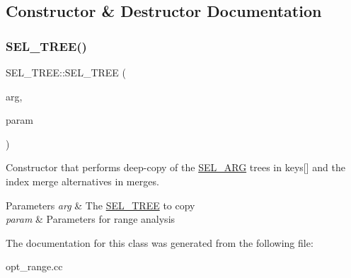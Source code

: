 \subsection{Constructor \& Destructor Documentation}
\mbox{\label{classSEL__TREE_aebc925ee4102808de1b168ec4989411c}} 
\subsubsection{\texorpdfstring{S\+E\+L\+\_\+\+T\+R\+E\+E()}{SEL\_TREE()}}
{\footnotesize\ttfamily S\+E\+L\+\_\+\+T\+R\+E\+E\+::\+S\+E\+L\+\_\+\+T\+R\+EE (\begin{DoxyParamCaption}\item[{\mbox{\hyperlink{classSEL__TREE}{S\+E\+L\+\_\+\+T\+R\+EE}} $\ast$}]{arg,  }\item[{\mbox{\hyperlink{classRANGE__OPT__PARAM}{R\+A\+N\+G\+E\+\_\+\+O\+P\+T\+\_\+\+P\+A\+R\+AM}} $\ast$}]{param }\end{DoxyParamCaption})}

Constructor that performs deep-\/copy of the \mbox{\hyperlink{classSEL__ARG}{S\+E\+L\+\_\+\+A\+RG}} trees in \textquotesingle{}keys\mbox{[}\mbox{]}\textquotesingle{} and the index merge alternatives in \textquotesingle{}merges\textquotesingle{}.


\begin{DoxyParams}{Parameters}
{\em arg} & The \mbox{\hyperlink{classSEL__TREE}{S\+E\+L\+\_\+\+T\+R\+EE}} to copy \\
\hline
{\em param} & Parameters for range analysis \\
\hline
\end{DoxyParams}


The documentation for this class was generated from the following file\+:\begin{DoxyCompactItemize}
\item 
opt\+\_\+range.\+cc\end{DoxyCompactItemize}
